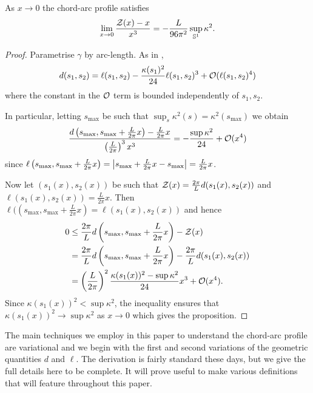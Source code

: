 \documentclass[a4paper, 12pt]{amsart}
\begin{document}
\begin{prop}
As $x\to 0$ the chord-arc profile satisfies
\[
\lim_{x\to 0} \frac{\operatorname{\mathcal{Z}}(x) - x}{x^3} = - \frac{L}{96\pi^2} \sup_{\mathbb{S}^1} \kappa^2.
\]
\end{prop}

\begin{proof}
Parametrise $\gamma$ by arc-length. As in \cite{MR2794630}, 
\[
d(s_1, s_2) = \ell(s_1,s_2) - \frac{\kappa(s_1)^2}{24} \ell(s_1,s_2)^3 + \operatorname{\mathcal{O}}(\ell(s_1, s_2)^4)
\]
where the constant in the $\operatorname{\mathcal{O}}$ term is bounded independently of $s_1,s_2$.

In particular, letting $s_{\max}$ be such that $\sup_s \kappa^2(s) = \kappa^2(s_{\max})$ we obtain
\[
\frac{d\left(s_{\max}, s_{\max} + \frac{L}{2\pi} x\right) - \frac{L}{2\pi}x}{\left(\tfrac{L}{2\pi}\right)^3 x^3} = -\frac{\sup \kappa^2}{24} + \operatorname{\mathcal{O}}(x^4)
\]
since $\ell\left(s_{\max}, s_{\max} + \frac{L}{2\pi} x\right) = \left\lvert{s_{\max} + \frac{L}{2\pi} x - s_{\max}}\right\rvert = \frac{L}{2\pi} x$.

Now let $(s_1(x), s_2(x))$ be such that $\operatorname{\mathcal{Z}}(x) = \frac{2\pi}{L} d(s_1(x), s_2(x))$ and $\ell(s_1(x), s_2(x)) = \frac{L}{2\pi} x$. Then $\ell(\left(s_{\max}, s_{\max} + \tfrac{L}{2\pi} x\right) = \ell(s_1(x), s_2(x))$ and hence
\[
\begin{split}
0 &\leq \frac{2\pi}{L}d\left(s_{\max}, s_{\max} + \frac{L}{2\pi}x\right) - \operatorname{\mathcal{Z}}(x) \\
&= \frac{2\pi}{L}d\left(s_{\max}, s_{\max} + \frac{L}{2\pi}x\right) - \frac{2\pi}{L} d(s_1(x), s_2(x)) \\
&= \left(\frac{L}{2\pi}\right)^2 \frac{\kappa(s_1(x))^2 - \sup \kappa^2}{24} x^3 + \operatorname{\mathcal{O}}(x^4).
\end{split}
\]
Since $\kappa(s_1(x))^2 < \sup \kappa^2$, the inequality ensures that $\kappa(s_1(x))^2 \to \sup \kappa^2$ as $x\to 0$ which gives the proposition.
\end{proof}

The main techniques we employ in this paper to understand the chord-arc profile are variational and we begin with the first and second variations of the geometric quantities $d$ and $\ell$. The derivation is fairly standard these days, but we give the full details here to be complete. It will prove useful to make various definitions that will feature throughout this paper.
\end{document}
